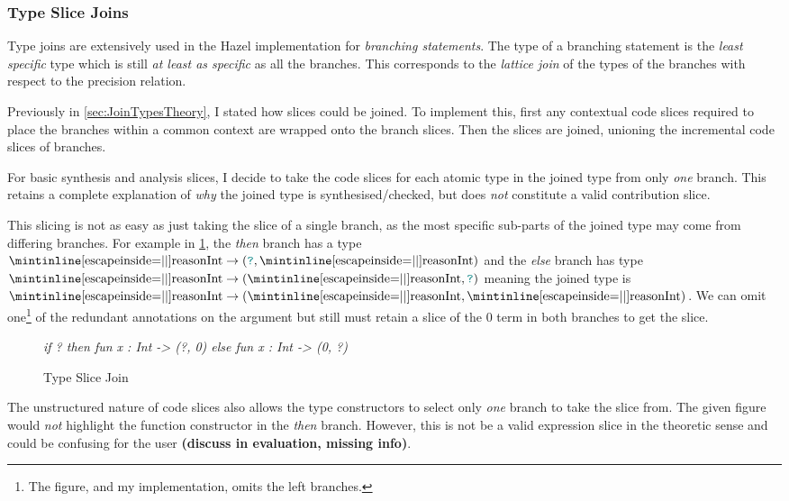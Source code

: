 \subsubsection{Type Slice Joins}
Type joins are extensively used in the Hazel implementation for \textit{branching statements}. The type of a branching statement is the \textit{least specific} type which is still \textit{at least as specific} as all the branches. This corresponds to the \textit{lattice join} of the types of the branches with respect to the precision relation. 

Previously in \cref{sec:JoinTypesTheory}, I stated how slices could be joined. To implement this, first any contextual code slices required to place the branches within a common context are wrapped onto the branch slices. Then the slices are joined, unioning the incremental code slices of branches.

For basic synthesis and analysis slices, I decide to take the code slices for each atomic type in the joined type from only \textit{one} branch. This retains a complete explanation of \textit{why} the joined type is synthesised/checked, but does \textit{not} constitute a valid contribution slice.

This slicing is not as easy as just taking the slice of a single branch, as the most specific sub-parts of the joined type may come from differing branches. For example in \cref{fig:TypeSliceJoinExample}, the \textit{then} branch has a type $\code{Int} \to (\dyn,\code{Int})$ and the \textit{else} branch has type $\code{Int} \to (\code{Int}, \dyn)$ meaning the joined type is $\code{Int} \to (\code{Int}, \code{Int})$. We can omit one\footnote{The figure, and my implementation, omits the left branches.} of the redundant annotations on the argument but still must retain a slice of the 0 term in both branches to get the  slice.
\begin{figure}[h]
\textit{if ? then fun x : Int -> (?, 0) else fun x : Int -> (0, ?)}
\caption{Type Slice Join}
\label{fig:TypeSliceJoinExample}
\end{figure}

The unstructured nature of code slices also allows the type constructors to select only \textit{one} branch to take the slice from. The given figure would \textit{not} highlight the function constructor in the \textit{then} branch. However, this is not be a valid expression slice in the theoretic sense and could be confusing for the user \textbf{(discuss in evaluation, missing info)}.


